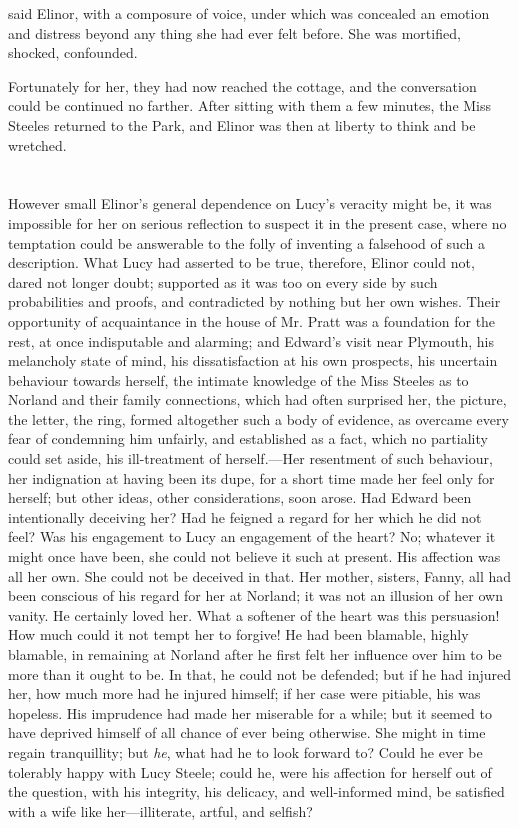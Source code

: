  said Elinor, with a composure of voice, under which was concealed an emotion and distress beyond any thing she had ever felt before. She was mortified, shocked, confounded.

Fortunately for her, they had now reached the cottage, and the conversation could be continued no farther. After sitting with them a few minutes, the Miss Steeles returned to the Park, and Elinor was then at liberty to think and be wretched.

\chapter{} %

However small Elinor's general dependence on Lucy's veracity might be, it was impossible for her on serious reflection to suspect it in the present case, where no temptation could be answerable to the folly of inventing a falsehood of such a description. What Lucy had asserted to be true, therefore, Elinor could not, dared not longer doubt; supported as it was too on every side by such probabilities and proofs, and contradicted by nothing but her own wishes. Their opportunity of acquaintance in the house of Mr. Pratt was a foundation for the rest, at once indisputable and alarming; and Edward's visit near Plymouth, his melancholy state of mind, his dissatisfaction at his own prospects, his uncertain behaviour towards herself, the intimate knowledge of the Miss Steeles as to Norland and their family connections, which had often surprised her, the picture, the letter, the ring, formed altogether such a body of evidence, as overcame every fear of condemning him unfairly, and established as a fact, which no partiality could set aside, his ill-treatment of herself.---Her resentment of such behaviour, her indignation at having been its dupe, for a short time made her feel only for herself; but other ideas, other considerations, soon arose. Had Edward been intentionally deceiving her? Had he feigned a regard for her which he did not feel? Was his engagement to Lucy an engagement of the heart? No; whatever it might once have been, she could not believe it such at present. His affection was all her own. She could not be deceived in that. Her mother, sisters, Fanny, all had been conscious of his regard for her at Norland; it was not an illusion of her own vanity. He certainly loved her. What a softener of the heart was this persuasion! How much could it not tempt her to forgive! He had been blamable, highly blamable, in remaining at Norland after he first felt her influence over him to be more than it ought to be. In that, he could not be defended; but if he had injured her, how much more had he injured himself; if her case were pitiable, his was hopeless. His imprudence had made her miserable for a while; but it seemed to have deprived himself of all chance of ever being otherwise. She might in time regain tranquillity; but {\em he}, what had he to look forward to? Could he ever be tolerably happy with Lucy Steele; could he, were his affection for herself out of the question, with his integrity, his delicacy, and well-informed mind, be satisfied with a wife like her---illiterate, artful, and selfish?

